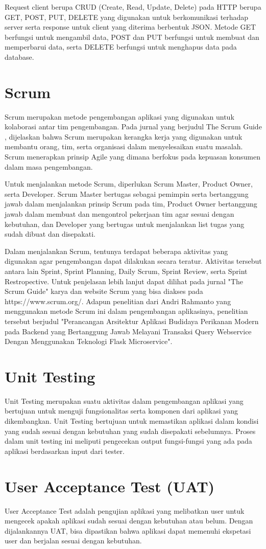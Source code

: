Request client berupa CRUD (Create, Read, Update, Delete) pada HTTP berupa GET, POST, PUT, DELETE yang digunakan untuk berkomunikasi terhadap server serta response untuk client yang diterima berbentuk JSON. Metode GET berfungsi untuk mengambil data, POST dan PUT berfungsi untuk membuat dan memperbarui data, serta DELETE berfungsi untuk menghapus data pada database.
\section{Scrum}

Scrum merupakan metode pengembangan aplikasi yang digunakan untuk kolaborasi antar tim pengembangan. Pada jurnal yang berjudul The Scrum Guide \citep{scrum}, dijelaskan bahwa Scrum merupakan kerangka kerja yang digunakan untuk membantu orang, tim, serta organisasi dalam menyelesaikan suatu masalah. Scrum menerapkan prinsip Agile yang dimana berfokus pada kepuasan konsumen dalam masa pengembangan.

Untuk menjalankan metode Scrum, diperlukan Scrum Master, Product Owner, serta Developer. Scrum Master bertugas sebagai pemimpin serta bertanggung jawab dalam menjalankan prinsip Scrum pada tim, Product Owner bertanggung jawab dalam membuat dan mengontrol pekerjaan tim agar sesuai dengan kebutuhan, dan Developer yang bertugas untuk menjalankan list tugas yang sudah dibuat dan disepakati.

Dalam menjalankan Scrum, tentunya terdapat beberapa aktivitas yang digunakan agar pengembangan dapat dilakukan secara teratur. Aktivitas tersebut antara lain Sprint, Sprint Planning, Daily Scrum, Sprint Review, serta Sprint Restropective. Untuk penjelasan lebih lanjut dapat dilihat pada jurnal "The Scrum Guide" karya \citep{scrum} dan website Scrum yang bisa diakses pada https://www.scrum.org/. Adapun penelitian dari Andri Rahmanto yang menggunakan metode Scrum ini dalam pengembangan aplikasinya, penelitian tersebut berjudul "Perancangan Arsitektur Aplikasi Budidaya Perikanan Modern pada Backend yang Bertanggung Jawab Melayani Transaksi Query Webservice Dengan Menggunakan Teknologi Flask Microservice".
\section{Unit Testing}

Unit Testing merupakan suatu aktivitas dalam pengembangan aplikasi yang bertujuan untuk menguji fungsionalitas serta komponen dari aplikasi yang dikembangkan. Unit Testing bertujuan untuk memastikan aplikasi dalam kondisi yang sudah sesuai dengan kebutuhan yang sudah disepakati sebelumnya. Proses dalam unit testing ini meliputi pengecekan output fungsi-fungsi yang ada pada aplikasi berdasarkan input dari tester.

\section{User Acceptance Test (UAT)}

User Acceptance Test adalah pengujian aplikasi yang melibatkan user untuk mengecek apakah aplikasi sudah sesuai dengan kebutuhan atau belum. Dengan dijalankannya UAT, bisa dipastikan bahwa aplikasi dapat memenuhi ekspetasi user dan berjalan sesuai dengan kebutuhan. 